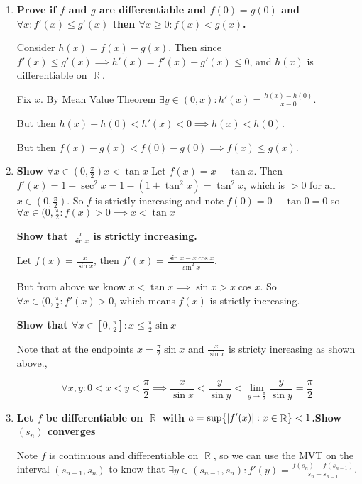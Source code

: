 \documentclass[10pt,a4paper]{article}
\DeclareMathOperator*{\R}{\mathbb{R}}
\DeclarePairedDelimiter{\abs}{\lvert}{\rvert}
\begin{document}
\begin{enumerate}
    \item \textbf{Prove if $f$ and $g$ are differentiable and $f(0)=g(0)$ and $\forall x : f'(x) \leq g'(x)$ then $\forall x \geq 0 : f(x) < g(x)$.}

        Consider $h(x) = f(x) -g(x)$. Then since $f'(x) \leq g'(x) \implies  h'(x) = f'(x) - g'(x) \leq 0$, and $h(x)$ is differentiable on $\R$. 

        Fix $x$. By Mean Value Theorem $\exists y \in (0, x): h'(x) = \frac{h(x) - h(0)}{x-0}$. 

        But then $ h(x)- h(0) < h'(x) < 0 \implies h(x) < h(0)$.

        But then $f(x) - g(x)  < f(0) - g(0) \implies f(x) \leq g(x)$.

    \item \textbf{Show $\forall x \in (0, \frac{\pi}{2}) x < \tan x $}
        Let $f(x) = x - \tan x$. Then $f'(x) = 1 - \sec^2 x = 1 - (1 + \tan^2 x) = \tan^2 x$, which is $>0$ for all $x \in (0, \frac{\pi}{2})$. So $f$ is strictly increasing and note $f(0) = 0 - \tan 0 = 0$ so $\forall x \in (0, \frac{\pi}{2} : f(x) > 0  \implies x < \tan x$

    \textbf{Show that $\frac{x}{\sin x}$ is strictly increasing. }

        Let $f(x) = \frac{x}{\sin x}$, then $f'(x) = \frac{\sin x - x \cos x }{\sin^2 x}$. 

        But from above we know $x < \tan x \implies \sin x > x \cos x$. So $\forall x \in (0, \frac{\pi}{2}: f'(x) > 0 $, which means $f(x)$ is strictly increasing.

    \textbf{Show that $\forall x \in [0, \frac{\pi}{2}]: x \leq \frac{\pi}{2} \sin x$}

        Note that at the endpoints $x = \frac{\pi}{2} \sin x$ and $\frac{x}{\sin x}$ is stricty increasing as shown above.,

        $$\forall x, y: 0 < x < y< \frac{\pi}{2} \implies \frac{x}{\sin x} < \frac{y}{\sin y} < \lim_{y \to \frac{\pi}{2}} \frac{y}{\sin y} = \frac{\pi}{2}$$

    \item \textbf{Let $f$ be differentiable on $\R$ with $a = \sup \{ \abs{f'(x)} : x \in \R \} < 1$.Show $(s_n)$ converges}
        
        Note $f$ is continuous and differentiable on $\R$, so we can use the MVT on the interval $(s_{n-1}, s_n)$ to know that $\exists y \in (s_{n-1}, s_n) : f'(y) = \frac{f(s_n) - f(s_{n-1})}{s_n - s_{n-1}}$.


\end{enumerate}
\end{document}
